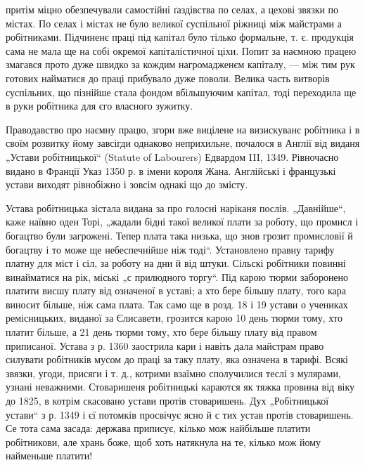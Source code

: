 \parcont{}
притім міцно обезпечували самостійні ґаздівства по селах,
а цехові звязки по містах. По селах і містах не було великої
суспільної ріжниці між майстрами а робітниками.
Підчиненє праці під капітал було тілько формальне, т. є.
продукція сама не мала ще на собі окремої капіталістичної
ціхи. Попит за наємною працею змагався прото дуже швидко
за кождим нагромадженєм капіталу, — між тим рук готових
найматися до праці прибувало дуже поволи. Велика
часть витворів суспільних, що пізнійше стала фондом вбільшуючим
капітал, тоді переходила ще в руки робітника для
єго власного зужитку.

Праводавство про наємну працю, згори вже вицілене
на визискуванє робітника і в своїм розвитку йому завсігди
однаково неприхильне, почалося в Англії від виданя „Устави
робітницької“ (Statute of Labourers) Едвардом III, 1349.
Рівночасно видано в Франції Указ 1350 р. в імени короля
Жана. Англійські і французькі устави виходят рівнобіжно
і зовсім однакі що до змісту.

Устава робітницька зістала видана за про голосні наріканя
послів. „Давнійше“, каже наївно оден Торі, „жадали
бідні такої великої плати за роботу, що промисл і богацтво
були загрожені. Тепер плата така низька, що знов грозит
промисловії й богацтву і то може ще небеспечнійше ніж
тоді“. Установлено правну тарифу платну для міст і сіл,
за роботу
на дни й від штуки. Сільскі робітники
повинні винайматися на рік, міські „с прилюдного
торгу“. Під карою тюрми заборонено платити висшу плату
від означеної в уставі; а хто бере більшу плату, того кара
виносит більше, ніж сама плата. Так само ще в розд. 18
і 19 устави о учениках ремісницьких, виданої за Єлисавети,
грозится карою 10 день тюрми тому, хто платит більше,
а 21 день тюрми тому, хто бере більшу плату від правом
приписаної. Устава з р. 1360 заострила кари і навіть дала
майстрам право силувати робітників мусом до праці за таку
плату, яка означена в тарифі. Всякі звязки, угоди, присяги
і т. д., котрими взаїмно сполучилися теслі з мулярами,
узнані неважними. Стоваришеня робітницькі караются як
тяжка провина від  віку до 1825, в котрім скасовано
устави протів стоваришень. Дух „Робітницької устави“ з р.
1349 і єї потомків просвічує ясно й с тих устав протів стоваришень.
Се тота сама засада: держава приписує, кілько
мож найбільше платити робітникови, але хрань боже, щоб
хоть натякнула на те, кілько мож йому найменьше платити!

